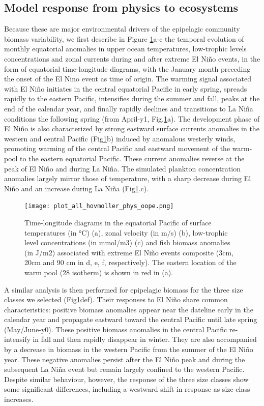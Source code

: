 \subsection{Model response from physics to ecosystems}

Because these are major environmental drivers of the epipelagic community biomass variability, we first describe in Figure \ref{fig:hov_nemo_ape}a-c the temporal evolution of monthly equatorial anomalies in upper ocean temperatures, low-trophic levels concentrations and zonal currents during and after extreme El Niño events, in the form of equatorial time-longitude diagrams, with the January month preceding the onset of the El Nino event as time of origin. The warming signal associated with El Niño initiates in the central equatorial Pacific in early spring, spreads rapidly to the eastern Pacific, intensifies during the summer and fall, peaks at the end of the calendar year, and finally rapidly declines and transitions to La Niña conditions the following spring (from April-y1, Fig.\ref{fig:hov_nemo_ape}a). The development phase of El Niño is also characterized by strong eastward surface currents anomalies in the western and central Pacific (Fig\ref{fig:hov_nemo_ape}b) induced by anomalous westerly winds, promoting warming of the central Pacific and eastward movement of the warm-pool to the eastern equatorial Pacific. These current anomalies reverse at the peak of El Niño and during La Niña. The simulated plankton concentration anomalies largely mirror those of temperature, with a sharp decrease during El Niño and an increase during La Niña (Fig\ref{fig:hov_nemo_ape}.c). 

\begin{figure}[h!tp]
	\centering
	\texttt{[image: plot\_all\_hovmoller\_phys\_oope.png]}	
	\caption{Time-longitude diagrams in the equatorial Pacific of surface temperatures (in °C) (a), zonal velocity (in m/s) (b), low-trophic level concentrations (in mmol/m3) (c) and fish biomass anomalies (in J/m2) associated with extreme El Niño events composite (3cm, 20cm and 90 cm in d, e, f, respectively). The eastern location of the warm pool (28\degree{} isotherm) is shown in red in (a).}	
	\label{fig:hov_nemo_ape}
\end{figure}

A similar analysis is then performed for epipelagic biomass for the three size classes we selected (Fig\ref{fig:hov_nemo_ape}def). Their responses to El Niño share common characteristics: positive biomass anomalies appear near the dateline early in the calendar year and propagate eastward toward the central Pacific until late spring (May/June-y0). These positive biomass anomalies in the central Pacific re-intensify in fall and then rapidly disappear in winter. They are also accompanied by a decrease in biomass in the western Pacific from the summer of the El Niño year. These negative anomalies persist after the El Niño peak and during the subsequent La Niña event but remain largely confined to the western Pacific. Despite similar behaviour, however, the response of the three size classes show some significant differences, including a westward shift in response as size class increases.

